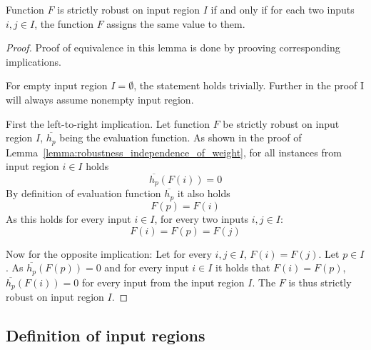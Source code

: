 \begin{lemma}{Function $F$ is strictly robust on input region $I$
    if and only if for each two inputs $i, j\in I$, the function $F$ assigns the same value to them.}
    \begin{proof}
        Proof of equivalence in this lemma is done
        by prooving corresponding implications.

        For empty input region $I=\emptyset$, the statement holds trivially.
        Further in the proof I will always assume nonempty input region.

        First the left-to-right implication.
        Let function $F$ be strictly robust on input region $I$,
        $\overline{h_p}$ being the evaluation function.
        As shown in the proof of Lemma~\ref{lemma:robustness_independence_of_weight},
        for all instances from input region $i\in I$ holds
        \begin{equation*}
            \overline{h_p}(F(i)) = 0
        \end{equation*}
        By definition of evaluation function $\overline{h_p}$ it also holds
        \begin{equation*}
            F(p) = F(i)
        \end{equation*}
        As this holds for every input $i\in I$, for every two inputs $i, j\in I$:
        \begin{equation*}
            F(i) = F(p) = F(j)
        \end{equation*}

        Now for the opposite implication: Let for every $i, j\in I$, $F(i) = F(j)$.
        Let $p\in I$. As $\overline{h_p}(F(p)) = 0$
        and for every input $i\in I$ it holds that $F(i) = F(p)$,
        $\overline{h_p}(F(i)) = 0$ for every input from the input region $I$.
        The $F$ is thus strictly robust on input region $I$.
    \end{proof}
\end{lemma}



\subsection{Definition of input regions}

